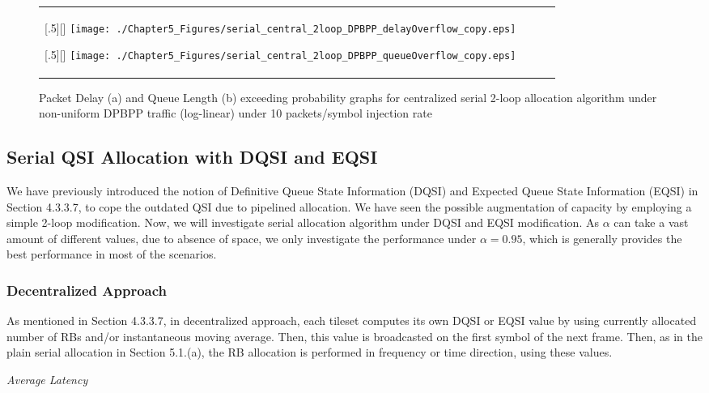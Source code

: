 \begin{figure*}[htbp]
  \centering
  \begin{tabular}[c]{cccc}

  \subcaptionbox{}[.5\linewidth][]{%
    \texttt{[image: ./Chapter5\_Figures/serial\_central\_2loop\_DPBPP\_delayOverflow\_copy.eps]}}	
    
  \subcaptionbox{}[.5\linewidth][]{%
    \texttt{[image: ./Chapter5\_Figures/serial\_central\_2loop\_DPBPP\_queueOverflow\_copy.eps]}}
 
   \end{tabular}

  \caption{Packet Delay (a) and Queue Length (b) exceeding probability graphs for centralized serial 2-loop allocation algorithm under non-uniform DPBPP traffic (log-linear) under 10 packets/symbol injection rate}
\end{figure*}

\subsection{Serial QSI Allocation with DQSI and EQSI}

We have previously introduced the notion of Definitive Queue State Information (DQSI) and Expected Queue State Information (EQSI) in Section 4.3.3.7, to cope the outdated QSI due to pipelined allocation. We have seen the possible augmentation of capacity by employing a simple 2-loop modification. Now, we will investigate serial allocation algorithm under DQSI and EQSI modification. As $\alpha$ can take a vast amount of different values, due to absence of space, we only investigate the performance under $\alpha = 0.95$, which is generally provides the best performance in most of the scenarios.

\subsubsection{Decentralized Approach}
As mentioned in Section 4.3.3.7, in decentralized approach, each tileset computes its own DQSI or EQSI value by using currently allocated number of RBs and/or instantaneous moving average. Then, this value is broadcasted on the first symbol of the next frame. Then, as in the plain serial allocation in Section 5.1.(a), the RB allocation is performed in frequency or time direction, using these values. 

\textit{Average Latency}


